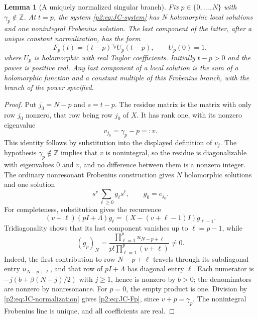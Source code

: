 \documentclass[11pt,a4paper]{article}
\newtheorem{lemma}[theorem]{Lemma}
\theoremstyle{definition}
\theoremstyle{remark}
\numberwithin{equation}{section}
\begin{document}
\begin{lemma}[A uniquely normalized singular branch]
\label{p2:lem:JC-Frobenius}
Fix $p\in\{0,\ldots,N\}$ with $\gamma_p\notin\mathbb Z$.
At $t=p$, the system \eqref{p2:eq:JC-system} has $N$ holomorphic local
solutions and one nonintegral Frobenius solution.  The last component
of the latter, after a unique constant normalization, has the form
\begin{equation}\label{p2:eq:JC-Fp}
 F_p(t)=(t-p)^{\gamma_p}U_p(t-p),\qquad U_p(0)=1,
\end{equation}
where $U_p$ is holomorphic with real Taylor coefficients.  Initially
$t-p>0$ and the power is positive real.  Any last component of a local
solution is the sum of a holomorphic function and a constant multiple
of this Frobenius branch, with the branch of the power specified.
\end{lemma}

\begin{proof}
Put $j_0=N-p$ and $s=t-p$.  The residue matrix is the matrix with
only row $j_0$ nonzero, that row being row $j_0$ of $X$.  It has
rank one, with its nonzero eigenvalue
\[
 v_{j_0}=\gamma_p-p=:v.
\]
This identity follows by substitution into the displayed definition
of $v_j$.  The hypothesis $\gamma_p\notin\mathbb Z$ implies that
$v$ is nonintegral, so the residue is diagonalizable with eigenvalues
$0$ and $v$, and no difference between them is a nonzero integer.
The ordinary nonresonant Frobenius construction gives $N$ holomorphic
solutions and one solution
\[
 s^v\sum_{\ell\ge0}g_\ell s^\ell,\qquad g_0=e_{j_0}.
\]
For completeness, substitution gives the recurrence
\[
 (v+\ell)(pI+\Lambda)g_\ell
       =(X-(v+\ell-1)I)g_{\ell-1}.
\]
Tridiagonality shows that its last component vanishes up to
$\ell=p-1$, while
\begin{equation}\label{p2:eq:JC-normalization}
 (g_p)_N=
 \frac{\prod_{\ell=1}^{p}u_{N-p+\ell}}
 {p!\prod_{\ell=1}^{p}(v+\ell)}\ne0.
\end{equation}
Indeed, the first contribution to row $N-p+\ell$ travels through
its subdiagonal entry $u_{N-p+\ell}$, and that row of
$pI+\Lambda$ has diagonal entry $\ell$.  Each numerator is
$-j(b+\beta(N-j)/2)$ with $j\ge1$, hence is nonzero by $b>0$;
the denominators are nonzero by nonresonance.  For $p=0$, the
empty product is one.  Division by \eqref{p2:eq:JC-normalization}
gives \eqref{p2:eq:JC-Fp}, since $v+p=\gamma_p$.  The nonintegral
Frobenius line is unique, and all coefficients are real.
\end{proof}
\end{document}
